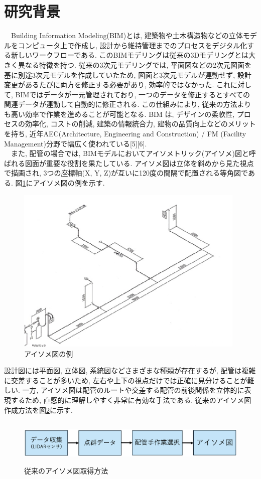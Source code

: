 \section{研究背景}
　Building Information Modeling(BIM)とは, 建築物や土木構造物などの立体モデルをコンピュータ上で作成し, 設計から維持管理までのプロセスをデジタル化する新しいワークフローである. 
このBIMモデリングは従来の3Dモデリングとは大きく異なる特徴を持つ. 
従来の3次元モデリングでは, 平面図などの2次元図面を基に別途3次元モデルを作成していたため, 図面と3次元モデルが連動せず, 設計変更があるたびに両方を修正する必要があり, 効率的ではなかった. 
これに対して, BIMではデータが一元管理されており, 一つのデータを修正するとすべての関連データが連動して自動的に修正される. 
この仕組みにより, 従来の方法よりも高い効率で作業を進めることが可能となる. 
BIM は, デザインの柔軟性, プロセスの効率化, コストの削減, 建築の情報統合力, 建物の品質向上などのメリットを持ち, 近年AEC(Architecture, Engineering and Construction) / FM (Facility Management)分野で幅広く使われている[5][6]. \\
　また, 配管の場合では, BIMモデルにおいてアイソメトリック(アイソメ)図と呼ばれる図面が重要な役割を果たしている. 
アイソメ図は立体を斜めから見た視点で描画され, 3つの座標軸(X, Y, Z)が互いに120度の間隔で配置される等角図である. 
図\ref{fig:f1}にアイソメ図の例を示す. 
\begin{figure}[htbt]
	\centering
	 \includegraphics[height=80mm]{Figure/ex_iso.eps}
	 \caption{アイソメ図の例}
	 \label{fig:f1}
\end{figure}
設計図には平面図, 立体図, 系統図などさまざまな種類が存在するが, 配管は複雑に交差することが多いため, 左右や上下の視点だけでは正確に見分けることが難しい. 
一方, アイソメ図は配管のルートや交差する配管の前後関係を立体的に表現するため, 直感的に理解しやすく非常に有効な手法である. 
従来のアイソメ図作成方法を図\ref{fig:f2}に示す. 
\begin{figure}[htbt]
	\centering
	 \includegraphics[height=22mm]{Figure/existing_research.eps}
	 \caption{従来のアイソメ図取得方法}
	 \label{fig:f2}
\end{figure}

